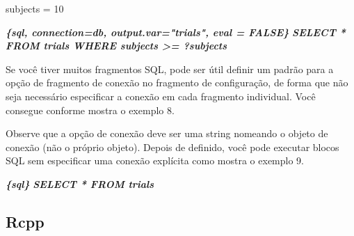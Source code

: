 \documentclass[
]{book}
\newenvironment{Shaded}{\begin{snugshade}}{\end{snugshade}}
\newcommand{\DataTypeTok}[1]{\textcolor[rgb]{0.13,0.29,0.53}{#1}}
\newcommand{\DecValTok}[1]{\textcolor[rgb]{0.00,0.00,0.81}{#1}}
\newcommand{\InformationTok}[1]{\textcolor[rgb]{0.56,0.35,0.01}{\textbf{\textit{#1}}}}
\newcommand{\KeywordTok}[1]{\textcolor[rgb]{0.13,0.29,0.53}{\textbf{#1}}}
\newcommand{\NormalTok}[1]{#1}
\newcommand{\OperatorTok}[1]{\textcolor[rgb]{0.81,0.36,0.00}{\textbf{#1}}}
\newcommand{\StringTok}[1]{\textcolor[rgb]{0.31,0.60,0.02}{#1}}
\begin{document}
\begin{Shaded}
\begin{Highlighting}[]
\NormalTok{subjects =}\StringTok{ }\DecValTok{10}
\end{Highlighting}
\end{Shaded}

\begin{Shaded}
\begin{Highlighting}[]
 \InformationTok{\textasciigrave{}\textasciigrave{}\textasciigrave{}\{sql, connection=db, output.var="trials", eval = FALSE\}}
\InformationTok{SELECT * FROM trials WHERE subjects \textgreater{}= ?subjects}
\InformationTok{\textasciigrave{}\textasciigrave{}\textasciigrave{}}
\end{Highlighting}
\end{Shaded}

Se você tiver muitos fragmentos SQL, pode ser útil definir um padrão para a opção de fragmento de conexão no fragmento de configuração, de forma que não seja necessário especificar a conexão em cada fragmento individual. Você consegue conforme mostra o exemplo 8.

\begin{Shaded}
\end{Shaded}

Observe que a opção de conexão deve ser uma string nomeando o objeto de conexão (não o próprio objeto). Depois de definido, você pode executar blocos SQL sem especificar uma conexão explícita como mostra o exemplo 9.

\begin{Shaded}
\begin{Highlighting}[]
 \InformationTok{\textasciigrave{}\textasciigrave{}\textasciigrave{}\{sql\}}
\InformationTok{SELECT * FROM trials}
\InformationTok{\textasciigrave{}\textasciigrave{}\textasciigrave{}}
\end{Highlighting}
\end{Shaded}

\hypertarget{rcpp}{%
\subsection{Rcpp}\label{rcpp}}
\end{document}
